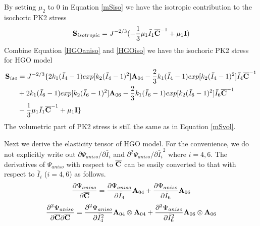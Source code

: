 By setting $\mu_2$ to $0$ in Equation \ref{mSiso} we have the isotropic contribution to the isochoric PK2 stress
\begin{equation} \label{HGOiso}
\bold{S}_{isotropic} = J^{-2/3}(-\frac{1}{3}\mu_1\bar{I}_1\overline{\bold{C}}^{-1} + \mu_1\bold{I})
\end{equation}
Combine Equation \ref{HGOaniso} and \ref{HGOiso} we have the isochoric PK2 stress for HGO model
\begin{equation} \label{HGOSiso}
\begin{split}
\bold{S}_{iso} &= J^{-2/3} \{2k_1{(\bar{I}_4-1)}exp[k_2(\bar{I}_4 - 1)^2]\bold{A}_{04} - \frac{2}{3}k_1{(\bar{I}_4-1)}exp[k_2(\bar{I}_4 - 1)^2]\bar{I}_4\overline{\bold{C}}^{-1} \\
&+ 
2k_1{(\bar{I}_6-1)}exp[k_2(\bar{I}_6 - 1)^2]\bold{A}_{06} - \frac{2}{3}k_1{(\bar{I}_6-1)}exp[k_2(\bar{I}_6 - 1)^2]\bar{I}_6\overline{\bold{C}}^{-1} \\
&-
\frac{1}{3}\mu_1\bar{I}_1\overline{\bold{C}}^{-1} + \mu_1\bold{I} \}
\end{split}
\end{equation}
The volumetric part of PK2 stress is still the same as in Equation \ref{mSvol}.

Next we derive the elasticity tensor of HGO model. For the convenience, we do not explicitly write out ${\partial\Psi_{aniso}}/{\partial{\bar{I}_i}}$ and $\partial^2{\Psi_{aniso}}/\partial{\bar{I}_i}^2$ where $i = 4, 6$. The derivatives of $\Psi_{aniso}$ with respect to $\overline{\bold{C}}$ can be easily converted to that with respect to $\bar{I}_{i}$ ($i = 4, 6$) as follows.
\begin{equation} \label{convert1}
\frac{\partial\Psi_{aniso}}{\partial\overline{\bold{C}}} = \frac{\partial\Psi_{aniso}}{\partial\bar{I}_4}\bold{A}_{04} + \frac{\partial\Psi_{aniso}}{\partial\bar{I}_6}\bold{A}_{06} 
\end{equation}
\begin{equation} \label{convert2}
\frac{\partial^2\Psi_{aniso}}{\partial{\overline{\bold{C}}}\partial{\overline{\bold{C}}}} = \frac{\partial^2\Psi_{aniso}}{\partial{\bar{I}_4}^2}\bold{A}_{04} \otimes \bold{A}_{04} +
\frac{\partial^2\Psi_{aniso}}{\partial{\bar{I}_6}^2}\bold{A}_{06} \otimes \bold{A}_{06} 
\end{equation}

